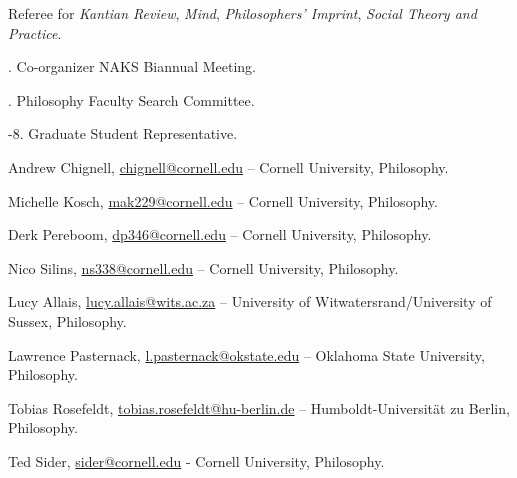 \documentclass[11pt]{article}
\begin{document}



  




\medskip

\ind Referee for \emph{Kantian Review}, \emph{Mind}, \emph{Philosophers' Imprint}, \emph{Social Theory and Practice}.

. Co-organizer NAKS Biannual Meeting.

. Philosophy Faculty Search Committee.

-8. Graduate Student Representative.

\bigskip

{}
\medskip

\ind Andrew Chignell, \href{mailto:chignell@cornell.edu}{chignell@cornell.edu} – Cornell University, Philosophy.
 
\ind Michelle Kosch, \href{mailto:mak229@cornell.edu}{mak229@cornell.edu} – Cornell University, Philosophy.
 
\ind Derk Pereboom, \href{mailto:dp346@cornell.edu}{dp346@cornell.edu} – Cornell University, Philosophy.

\ind Nico Silins, \href{mailto:ns338@cornell.edu}{ns338@cornell.edu} – Cornell University, Philosophy.

\medskip

\noindent Lucy Allais, \href{mailto:lucy.allais@wits.ac.za}{lucy.allais@wits.ac.za} – University of Witwatersrand/University of Sussex, Philosophy.

\noindent Lawrence Pasternack, \href{mailto:l.pasternack@okstate.edu}{l.pasternack@okstate.edu} – Oklahoma State University, Philosophy. 

\noindent Tobias Rosefeldt, \href{mailto:tobias.rosefeldt@hu-berlin.de}{tobias.rosefeldt@hu-berlin.de} – Humboldt-Universität zu Berlin, Philosophy.

\noindent Ted Sider, \href{mailto:sider@cornell.edu}{sider@cornell.edu} - Cornell University, Philosophy.
\end{document}
